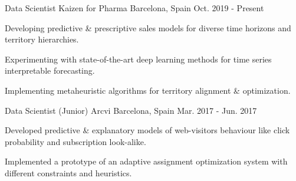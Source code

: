 
\begin{cventries}

\cventry
  {Data Scientist}
  {Kaizen for Pharma}
  {Barcelona, Spain}
  {Oct. 2019 - Present}
  {
    \begin{cvitems}
      \item {Developing predictive \& prescriptive sales models for diverse time horizons and territory hierarchies.}
      \item {Experimenting with state-of-the-art deep learning methods for time series interpretable forecasting.}
      \item {Implementing metaheuristic algorithms for territory alignment \& optimization.}
    \end{cvitems}
  }

\cventry
  {Data Scientist (Junior)}
  {Arcvi}
  {Barcelona, Spain}
  {Mar. 2017 - Jun. 2017}
  {
    \begin{cvitems}
      \item {Developed predictive \& explanatory models of web-visitors behaviour like click probability and subscription look-alike.}
      \item {Implemented a prototype of an adaptive assignment optimization system with different constraints and heuristics.}
    \end{cvitems}
  }

\end{cventries}

